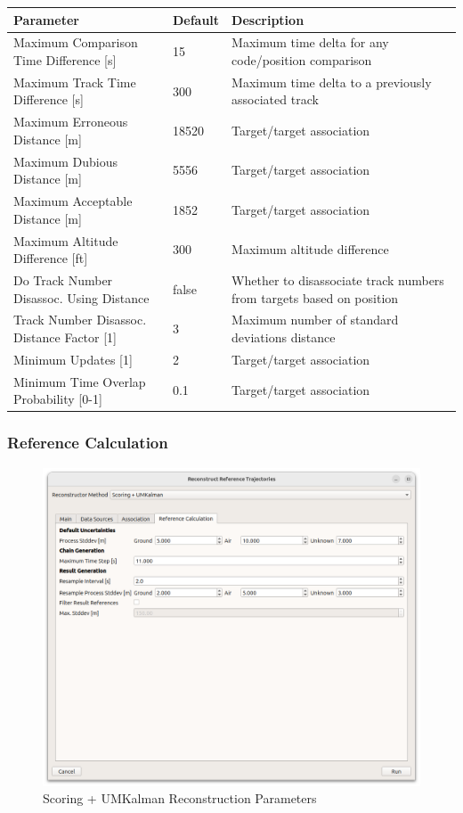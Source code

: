 \begin{table}[H]
  \center
  \begin{tabularx}{\textwidth}{ | l | l | X |}
    \hline
    \textbf{Parameter} & \textbf{Default} &  \textbf{Description} \\ \hline
    Maximum Comparison Time Difference [s] & 15 & Maximum time delta for any code/position comparison \\ \hline 
    Maximum Track Time Difference [s] & 300 & Maximum time delta to a previously associated track \\ \hline
    Maximum Erroneous Distance [m] & 18520 & Target/target association \\ \hline
    Maximum Dubious Distance [m] & 5556 & Target/target association \\ \hline
    Maximum Acceptable Distance [m] & 1852 & Target/target association \\ \hline
    Maximum Altitude Difference [ft] & 300 & Maximum altitude difference \\ \hline
    Do Track Number Disassoc. Using Distance & false & Whether to disassociate track numbers from targets based on position \\ \hline
    Track Number Disassoc. Distance Factor [1] & 3 & Maximum number of standard deviations distance \\ \hline
    Minimum Updates [1] & 2 & Target/target association \\ \hline
    Minimum Time Overlap Probability [0-1] & 0.1 & Target/target association \\ \hline
  \end{tabularx}
\end{table}

\subsubsection{Reference Calculation}
\label{sec:reconst_scorum_ref_calc} 

\begin{figure}[H]
    \center
      \includegraphics[width=16cm]{figures/dialog_ref_calc.png}
    \caption{Scoring + UMKalman Reconstruction Parameters}
\end{figure}

